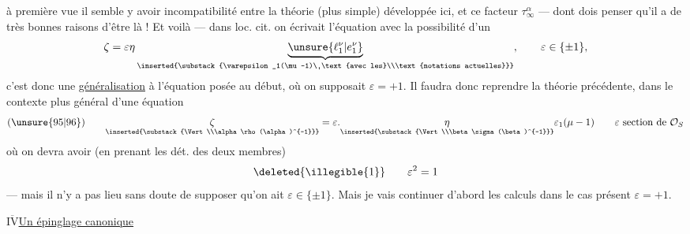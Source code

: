 à première vue il semble y avoir incompatibilité entre la théorie (plus simple) développée ici, et ce facteur $\tau_\infty^\alpha$ --- dont  dois penser qu'il a de très bonnes raisons d'être là ! Et voilà --- dans loc. cit. on écrivait l'équation   avec la possibilité d'un 
\[
\zeta=\varepsilon\eta
\underbrace{\unsure{\ell_1^\nu|e_1^\nu}}_{\inserted{\substack{\varepsilon_1(\mu-1)\ \text{avec les}\\\text{notations actuelles}}}},
\qquad\varepsilon\in\{\pm1\},
\]
c'est donc une \uline{généralisation}  à l'équation posée au début, où on supposait $\varepsilon=+1$.
Il faudra donc  reprendre la théorie précédente, dans le contexte plus général d'une équation
\[
(\unsure{95|96})\qquad
\underset{\inserted{\substack{\Vert\\\alpha\rho(\alpha)^{-1}}}}{\zeta}
=\varepsilon.\underset{\inserted{\substack{\Vert\\\beta\sigma(\beta)^{-1}}}}{\eta}\varepsilon_1(\mu-1)
\qquad\varepsilon\ \text{section de }\mathcal O_S
\]
où on devra avoir (en prenant les dét. des deux membres) 
\[
\deleted{\illegible{1}}\qquad\varepsilon^2=1
\]
--- mais il n'y a pas lieu sans doute de supposer qu'on ait $\varepsilon\in\{\pm1\}$. Mais je vais continuer d'abord les calculs dans le cas présent $\varepsilon=+1$.



\uline{$\overline{\mathrm{IV}}$}\qquad\uline{Un épinglage canonique}

